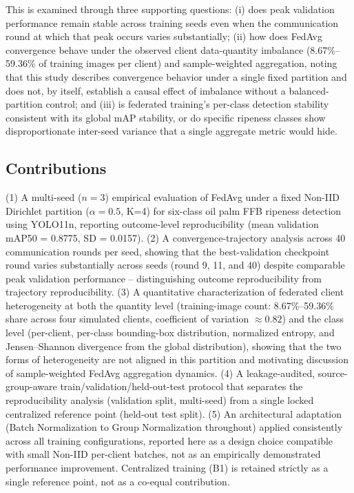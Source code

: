 \documentclass[11pt]{article}
\begin{document}
This is examined through three supporting questions: (i) does peak validation performance remain stable across training seeds even when the communication round at which that peak occurs varies substantially; (ii) how does FedAvg convergence behave under the observed client data-quantity imbalance (8.67\%--59.36\% of training images per client) and sample-weighted aggregation, noting that this study describes convergence behavior under a single fixed partition and does not, by itself, establish a causal effect of imbalance without a balanced-partition control; and (iii) is federated training's per-class detection stability consistent with its global mAP stability, or do specific ripeness classes show disproportionate inter-seed variance that a single aggregate metric would hide.

\subsection*{Contributions}
(1) A multi-seed ($n=3$) empirical evaluation of FedAvg under a fixed Non-IID Dirichlet partition ($\alpha=0.5$, K=4) for six-class oil palm FFB ripeness detection using YOLO11n, reporting outcome-level reproducibility (mean validation mAP50 = 0.8775, SD = 0.0157). (2) A convergence-trajectory analysis across 40 communication rounds per seed, showing that the best-validation checkpoint round varies substantially across seeds (round 9, 11, and 40) despite comparable peak validation performance -- distinguishing outcome reproducibility from trajectory reproducibility. (3) A quantitative characterization of federated client heterogeneity at both the quantity level (training-image count: 8.67\%--59.36\% share across four simulated clients, coefficient of variation $\approx 0.82$) and the class level (per-client, per-class bounding-box distribution, normalized entropy, and Jensen--Shannon divergence from the global distribution), showing that the two forms of heterogeneity are not aligned in this partition and motivating discussion of sample-weighted FedAvg aggregation dynamics. (4) A leakage-audited, source-group-aware train/validation/held-out-test protocol that separates the reproducibility analysis (validation split, multi-seed) from a single locked centralized reference point (held-out test split). (5) An architectural adaptation (Batch Normalization to Group Normalization throughout) applied consistently across all training configurations, reported here as a design choice compatible with small Non-IID per-client batches, not as an empirically demonstrated performance improvement. Centralized training (B1) is retained strictly as a single reference point, not as a co-equal contribution.
\end{document}
